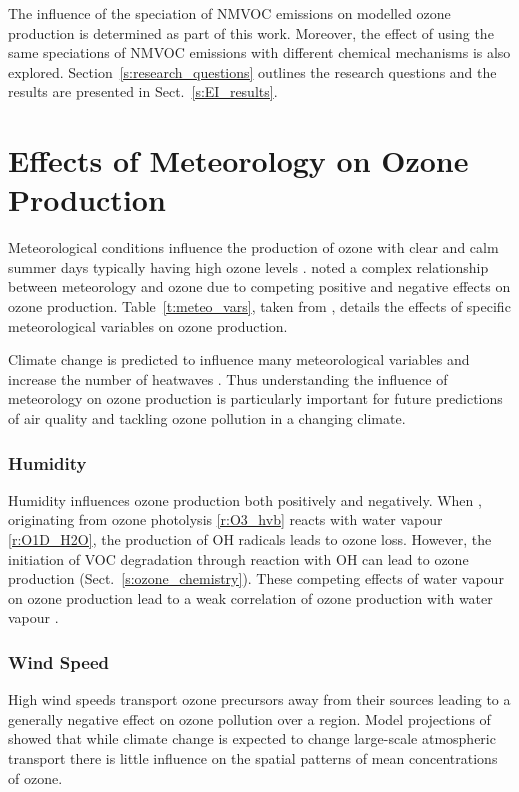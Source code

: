 The influence of the speciation of NMVOC emissions on modelled ozone production is determined as part of this work.
Moreover, the effect of using the same speciations of NMVOC emissions with different chemical mechanisms is also explored.
Section~\ref{s:research_questions} outlines the research questions and the results are presented in Sect.~\ref{s:EI_results}.

\section{Effects of Meteorology on Ozone Production} \label{s:meteo_ozone}
Meteorological conditions influence the production of ozone with clear and calm summer days typically having high ozone levels \citep{Duenas:2002}.
\citet{Comrie:1997} noted a complex relationship between meteorology and ozone due to competing positive and negative effects on ozone production.
Table~\ref{t:meteo_vars}, taken from \citet{Jacob:2009}, details the effects of specific meteorological variables on ozone production.

Climate change is predicted to influence many meteorological variables and increase the number of heatwaves \citep{Karl:2003}.
Thus understanding the influence of meteorology on ozone production is particularly important for future predictions of air quality and tackling ozone pollution in a changing climate.

\vspace{-3mm}
\subsubsection{Humidity}
\vspace{-3mm}
Humidity influences ozone production both positively and negatively.
When , originating from ozone photolysis \eqref{r:O3_hvb} reacts with water vapour \eqref{r:O1D_H2O}, the production of OH radicals leads to ozone loss.
However, the initiation of VOC degradation through reaction with OH can lead to ozone production (Sect.~\ref{s:ozone_chemistry}).
These competing effects of water vapour on ozone production lead to a weak correlation of ozone production with water vapour \citep{Jacob:2009}.

\vspace{-3mm}
\subsubsection{Wind Speed}
\vspace{-3mm}
High wind speeds transport ozone precursors away from their sources leading to a generally negative effect on ozone pollution over a region.
Model projections of \citet{Doherty:2013} showed that while climate change is expected to change large-scale atmospheric transport there is little influence on the spatial patterns of mean concentrations of ozone.

